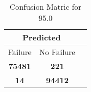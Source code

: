 \begin{table}[] 
\caption{Confusion Matric for 95.0} 
\label{Table: Prediction Accuracy-DMD95.0OnlySunEKF-ignoreReflectionEKF-top2perfectNoFailurePrediction-Reflection} 
\centering 
\begin{tabular} 
 {@{}ccc@{}} 
\toprule 
\multicolumn{2}{c}{\textbf{Predicted}}
 \\ \midrule 
\multicolumn{1}{|c|}{Failure} & 
\multicolumn{1}{c|}{No Failure}
 \\ \midrule 
\multicolumn{1}{|c|}{\color{green}\textbf{75481}} & 
\multicolumn{1}{c|}{\color{red}\textbf{221}}
 \\ \midrule 
\multicolumn{1}{|c|}{\color{red}\textbf{14}} & 
\multicolumn{1}{c|}{\color{green}\textbf{94412}}
 \\ \bottomrule 
\end{tabular} 
\end{table} 
